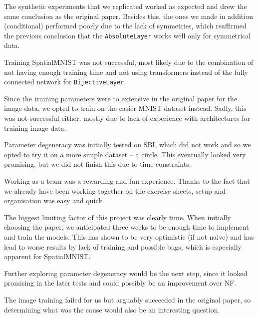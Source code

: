 

The synthetic experiments that we replicated worked as expected and drew the same conclusion as the original paper.
Besides this, the ones we made in addition (conditional) performed poorly due to the lack of symmetries, which reaffirmed the previous conclusion that the \texttt{AbsoluteLayer} works well only for symmetrical data.

Training SpatialMNIST was not successful, most likely due to the combination of not having enough training time and not using transformers instead of the fully connected network for \texttt{BijectiveLayer}.

Since the training parameters were to extensive in the original paper for the image data, we opted to train on the easier MNIST dataset instead.
Sadly, this was not successful either, mostly due to lack of experience with architectures for training image data.

Parameter degeneracy was initially tested on SBI, which did not work and so we opted to try it on a more simple dataset -- a circle.
This eventually looked very promising, but we did not finish this due to time constraints.

Working as a team was a rewarding and fun experience. Thanks to the fact that we already have been working together on the exercise sheets, setup and organisation was easy and quick. 

The biggest limiting factor of this project was clearly time. When initially choosing the paper, we anticipated three weeks to be enough time to implement and train the models. This has shown to be very optimistic (if not naive) and has lead to worse results by lack of training and possible bugs, which is especially apparent for SpatialMNIST.


Further exploring parameter degeneracy would be the next step, since it looked promising in the later tests and could possibly be an improvement over NF.

The image training failed for us but arguably succeeded in the original paper, so determining what was the cause would also be an interesting question.
